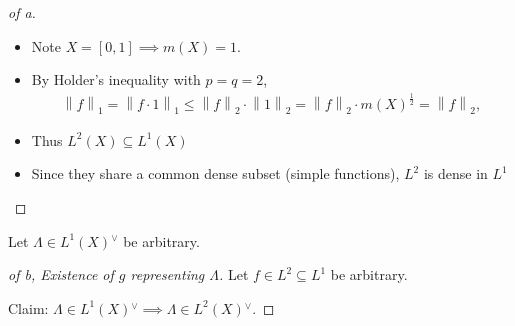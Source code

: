 \begin{solution}

\envlist

\begin{proof}[of a]

\envlist

\begin{itemize}
\item
  Note \(X = [0, 1] \implies m(X) = 1\).
\item
  By Holder's inequality with \(p=q=2\),
  \begin{align*}
  {\left\lVert {f} \right\rVert}_1 = {\left\lVert {f\cdot 1} \right\rVert}_1 \leq {\left\lVert {f} \right\rVert}_2 \cdot {\left\lVert {1} \right\rVert}_2 = {\left\lVert {f} \right\rVert}_2 \cdot m(X)^{\frac 1 2} = {\left\lVert {f} \right\rVert}_2,
  \end{align*}
\item
  Thus \(L^2(X) \subseteq L^1(X)\)
\item
  Since they share a common dense subset (simple functions), \(L^2\) is
  dense in \(L^1\)
\end{itemize}

\end{proof}

Let \(\Lambda \in L^1(X) {}^{ \vee }\) be arbitrary.

\begin{proof}[of b, Existence of $g$ representing $\Lambda$]

Let \(f\in L^2\subseteq L^1\) be arbitrary.

Claim:
\(\Lambda\in L^1(X) {}^{ \vee }\implies \Lambda \in L^2(X) {}^{ \vee }\).


\end{proof}
\end{solution}
